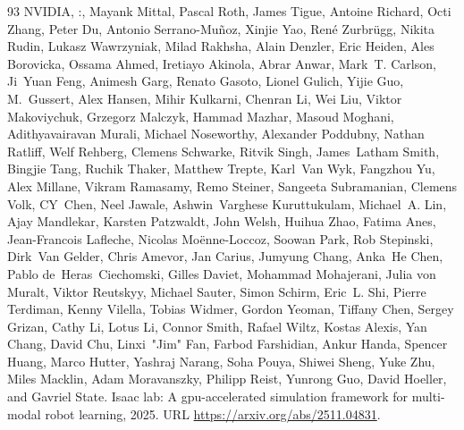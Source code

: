 \begin{thebibliography}{93}
NVIDIA, :, Mayank Mittal, Pascal Roth, James Tigue, Antoine Richard, Octi
  Zhang, Peter Du, Antonio Serrano-Muñoz, Xinjie Yao, René Zurbrügg, Nikita
  Rudin, Lukasz Wawrzyniak, Milad Rakhsha, Alain Denzler, Eric Heiden, Ales
  Borovicka, Ossama Ahmed, Iretiayo Akinola, Abrar Anwar, Mark~T. Carlson,
  Ji~Yuan Feng, Animesh Garg, Renato Gasoto, Lionel Gulich, Yijie Guo,
  M.~Gussert, Alex Hansen, Mihir Kulkarni, Chenran Li, Wei Liu, Viktor
  Makoviychuk, Grzegorz Malczyk, Hammad Mazhar, Masoud Moghani, Adithyavairavan
  Murali, Michael Noseworthy, Alexander Poddubny, Nathan Ratliff, Welf Rehberg,
  Clemens Schwarke, Ritvik Singh, James~Latham Smith, Bingjie Tang, Ruchik
  Thaker, Matthew Trepte, Karl~Van Wyk, Fangzhou Yu, Alex Millane, Vikram
  Ramasamy, Remo Steiner, Sangeeta Subramanian, Clemens Volk, CY~Chen, Neel
  Jawale, Ashwin~Varghese Kuruttukulam, Michael~A. Lin, Ajay Mandlekar, Karsten
  Patzwaldt, John Welsh, Huihua Zhao, Fatima Anes, Jean-Francois Lafleche,
  Nicolas Moënne-Loccoz, Soowan Park, Rob Stepinski, Dirk~Van Gelder, Chris
  Amevor, Jan Carius, Jumyung Chang, Anka~He Chen, Pablo de~Heras~Ciechomski,
  Gilles Daviet, Mohammad Mohajerani, Julia von Muralt, Viktor Reutskyy,
  Michael Sauter, Simon Schirm, Eric~L. Shi, Pierre Terdiman, Kenny Vilella,
  Tobias Widmer, Gordon Yeoman, Tiffany Chen, Sergey Grizan, Cathy Li, Lotus
  Li, Connor Smith, Rafael Wiltz, Kostas Alexis, Yan Chang, David Chu,
  Linxi~"Jim" Fan, Farbod Farshidian, Ankur Handa, Spencer Huang, Marco Hutter,
  Yashraj Narang, Soha Pouya, Shiwei Sheng, Yuke Zhu, Miles Macklin, Adam
  Moravanszky, Philipp Reist, Yunrong Guo, David Hoeller, and Gavriel State.
\newblock Isaac lab: A gpu-accelerated simulation framework for multi-modal
  robot learning, 2025.
\newblock URL \url{https://arxiv.org/abs/2511.04831}.


\end{thebibliography}
